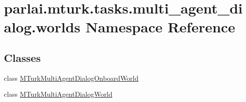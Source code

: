\hypertarget{namespaceparlai_1_1mturk_1_1tasks_1_1multi__agent__dialog_1_1worlds}{}\section{parlai.\+mturk.\+tasks.\+multi\+\_\+agent\+\_\+dialog.\+worlds Namespace Reference}
\label{namespaceparlai_1_1mturk_1_1tasks_1_1multi__agent__dialog_1_1worlds}
\subsection*{Classes}
\begin{DoxyCompactItemize}
\item 
class \hyperlink{classparlai_1_1mturk_1_1tasks_1_1multi__agent__dialog_1_1worlds_1_1MTurkMultiAgentDialogOnboardWorld}{M\+Turk\+Multi\+Agent\+Dialog\+Onboard\+World}
\item 
class \hyperlink{classparlai_1_1mturk_1_1tasks_1_1multi__agent__dialog_1_1worlds_1_1MTurkMultiAgentDialogWorld}{M\+Turk\+Multi\+Agent\+Dialog\+World}
\end{DoxyCompactItemize}
